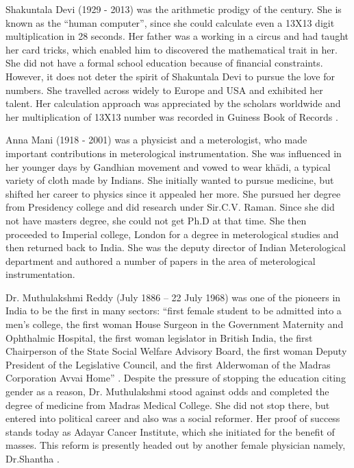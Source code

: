 \documentclass[a4paper,10pt]{article}
\begin{document}
\newblock
Shakuntala Devi (1929 - 2013) was the arithmetic prodigy of the century. She is known as the ``human computer'', since she could calculate even a 13X13 digit multiplication in 28 seconds. Her father was a working in a circus and had taught her card tricks, which enabled him to discovered the mathematical trait in her. She did not have a formal school education because of financial constraints. However, it does not deter the spirit of Shakuntala Devi to pursue the love for numbers. She travelled across widely to Europe and USA and exhibited her talent. Her calculation approach was appreciated by the scholars worldwide and her multiplication of 13X13 number was recorded in Guiness Book of Records \cite{shakuntala}. 

\newblock
Anna Mani (1918 - 2001) was a physicist and a meterologist, who made important contributions in meterological instrumentation. She was influenced in her younger days by Gandhian movement and vowed to wear kh\={a}di, a typical variety of cloth made by Indians. She initially wanted to pursue medicine, but shifted her career to physics since it appealed her more. She pursued her degree from Presidency college and did research under Sir.C.V. Raman. Since she did not have masters degree, she could not get Ph.D at that time. She then proceeded to Imperial college, London for a degree in meterological studies and then returned back to India. She was the deputy director of Indian Meterological department and authored a number of papers in the area of meterological instrumentation. \cite{anna}

Dr. Muthulakshmi Reddy (July 1886 – 22 July 1968) was one of the pioneers in India to be the first in many sectors: ``first female student to be admitted into a men's college, the first woman House Surgeon in the Government Maternity and Ophthalmic Hospital, the first woman legislator in British India, the first Chairperson of the State Social Welfare Advisory Board, the first woman Deputy President of the Legislative Council, and the first Alderwoman of the Madras Corporation Avvai Home'' \cite{reddy}. Despite the pressure of stopping the education citing gender as a reason, Dr. Muthulakshmi stood against odds and completed the degree of medicine from Madras Medical College. She did not stop there, but entered into political career and also was a social reformer. Her proof of success stands today as Adayar Cancer Institute, which she initiated for the benefit of masses. This reform is presently headed out by another female physician namely, Dr.Shantha \cite{shantha}. 
\end{document}
